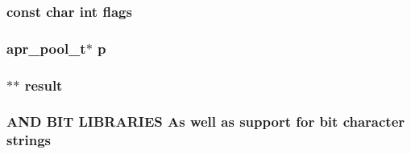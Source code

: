 \subsubsection[{\texorpdfstring{flags}{flags}}]{\setlength{\rightskip}{0pt plus 5cm}const char {\bf int} flags}\hypertarget{group__apr__fnmatch_ga3e6d697dc0ff44866a7ba96989912775}{}\label{group__apr__fnmatch_ga3e6d697dc0ff44866a7ba96989912775}
\subsubsection[{\texorpdfstring{p}{p}}]{ {\bf apr\+\_\+pool\+\_\+t}$\ast$ p}\hypertarget{group__apr__fnmatch_ga4aaa19306a024e92edb34e88100061f6}{}\label{group__apr__fnmatch_ga4aaa19306a024e92edb34e88100061f6}
\subsubsection[{\texorpdfstring{result}{result}}]{$\ast$$\ast$ result}\hypertarget{group__apr__fnmatch_ga5870bc70d0e7e1e79ec7b4c512a92c4b}{}\label{group__apr__fnmatch_ga5870bc70d0e7e1e79ec7b4c512a92c4b}
\subsubsection[{\texorpdfstring{strings}{strings}}]{ {\bf A\+ND} {\bf B\+IT} L\+I\+B\+R\+A\+R\+I\+ES As well {\bf as} {\bf support} for {\bf bit} {\bf character} strings}\hypertarget{group__apr__fnmatch_ga6bd51e9b0d3b446565e6e777ec78376c}{}\label{group__apr__fnmatch_ga6bd51e9b0d3b446565e6e777ec78376c}
